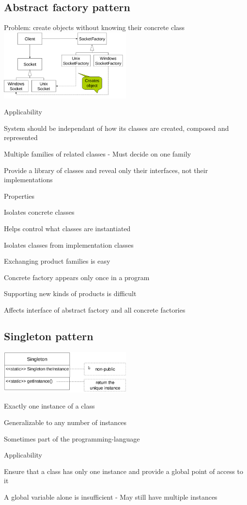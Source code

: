 \subsection{Abstract factory pattern}
\enumstart
	\item Problem: create objects without knowing their concrete class
	\\ \includegraphics[width=0.5\textwidth]{img/abstract_factory_pattern.png}
	\item Applicability
	\enumstart
		\item System should be independant of how its classes are created, composed and represented
		\item Multiple families of related classes - Must decide on one family
		\item Provide a library of classes and reveal only their interfaces, not their implementations
	\enumend
	\item Properties
	\enumstart
		\item Isolates concrete classes
		\enumstart
			\item Helps control what classes are instantiated
			\item Isolates classes from implementation classes
		\enumend
		\item Exchanging product families is easy
		\enumstart
			\item Concrete factory appears only once in a program
		\enumend
		\item Supporting new kinds of products is difficult
		\enumstart
			\item Affects interface of abstract factory and all concrete factories
		\enumend
	\enumend
\enumend

\subsection{Singleton pattern}
\includegraphics[width=0.5\textwidth]{img/singleton_pattern.png}
\enumstart
	\item Exactly one instance of a class
	\item Generalizable to any number of instances
	\item Sometimes part of the programming-language
	\item Applicability
	\enumstart
		\item Ensure that a class has only one instance and provide a global point of access to it
		\item A global variable alone is insufficient - May still have multiple instances
	\enumend
\enumend

